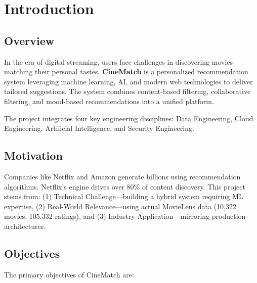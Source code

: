 \documentclass[12pt,a4paper]{report}
\begin{document}
\setcounter{page}{1}

\chapter{Introduction}

\section{Overview}

In the era of digital streaming, users face challenges in discovering movies matching their personal tastes. \textbf{CineMatch} is a personalized recommendation system leveraging machine learning, AI, and modern web technologies to deliver tailored suggestions. The system combines content-based filtering, collaborative filtering, and mood-based recommendations into a unified platform.

The project integrates four key engineering disciplines: Data Engineering, Cloud Engineering, Artificial Intelligence, and Security Engineering.

\section{Motivation}

Companies like Netflix and Amazon generate billions using recommendation algorithms. Netflix's engine drives over 80\% of content discovery. This project stems from: (1) Technical Challenge---building a hybrid system requiring ML expertise, (2) Real-World Relevance---using actual MovieLens data (10,322 movies, 105,332 ratings), and (3) Industry Application---mirroring production architectures.

\section{Objectives}

The primary objectives of CineMatch are:
\end{document}
